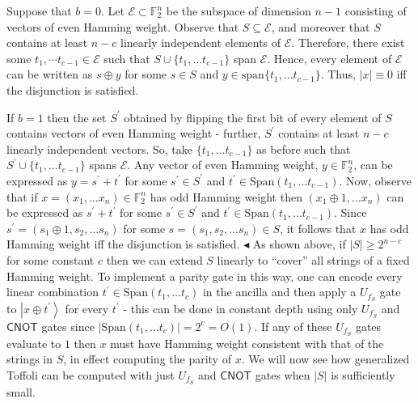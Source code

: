 Suppose that $b=0$. Let $\mathcal{E}\subset\mathbb{F}_{2}^{n}$ be the subspace of dimension $n-1$ consisting of vectors of even Hamming weight. Observe that $S\subseteq\mathcal{E}$, and moreover that $S$ contains at least $n-c$ linearly independent elements of $\mathcal{E}$. Therefore, there exist some $t_{1},\cdots t_{c-1}\in\mathcal{E}$ such that $S\cup\{t_{1},\dots t_{c-1}\}$ span $\mathcal{E}$. Hence, every element of $\mathcal{E}$ can be written as $s\oplus y$ for some $s\in S$ and $y\in\text{span}\{t_{1},\dots t_{c-1}\}$. Thus, $|x|\equiv 0$ iff the disjunction is satisfied.\par




If $b=1$ then the set $S^{\prime}$ obtained by flipping the first bit of every element of $S$ contains vectors of even Hamming weight - further, $S^{\prime}$ contains at least $n-c$ linearly independent vectors. So, take $\{t_{1},\dots t_{c-1}\}$ as before such that $S^{\prime}\cup\{t_{1},\dots t_{c-1}\}$ spans $\mathcal{E}$. Any vector of even Hamming weight, $y\in\mathbb{F}_{2}^{n}$, can be expressed as $y=s^{\prime}+t^{\prime}$ for some $s^{\prime}\in S^{\prime}$ and $t^{\prime}\in\text{Span}(t_{1},\dots t_{c-1})$. Now, observe that if $x=(x_{1},\dots x_{n})\in\mathbb{F}_{2}^{n}$ has odd Hamming weight then $(x_{1}\oplus 1,\dots x_{n})$ can be expressed as $s^{\prime}+t^{\prime}$ for some $s^{\prime}\in S^{\prime}$ and $t^{\prime}\in\text{Span}(t_{1},\dots t_{c-1})$. Since $s^{\prime}=(s_{1}\oplus 1,s_{2},\dots s_{n})$ for some $s=(s_{1},s_{2},\dots s_{n})\in S$, it follows that $x$ has odd Hamming weight iff the disjunction is satisfied.
$\blacktriangleleft$
As shown above, if $|S|\geq 2^{n-c}$ for some constant $c$ then we can extend $S$ linearly to “cover” all strings of a fixed Hamming weight. To implement a parity gate in this way, one can encode every linear combination $t^{\prime}\in\text{Span}(t_{1},\dots t_{c})$ in the ancilla and then apply a $U_{f_{S}}$ gate to $\left|x\oplus t^{\prime}\right\rangle$ for every $t^{\prime}$ - this can be done in constant depth using only $U_{f_{S}}$ and $\mathsf{CNOT}$ gates since $|\text{Span}(t_{1},\dots t_{c})|=2^{c}=O(1)$. If any of these $U_{f_{S}}$ gates evaluate to $1$ then $x$ must have Hamming weight consistent with that of the strings in $S$, in effect computing the parity of $x$. We will now see how generalized Toffoli can be computed with just $U_{f_{S}}$ and $\mathsf{CNOT}$ gates when $|S|$ is sufficiently small.\par



